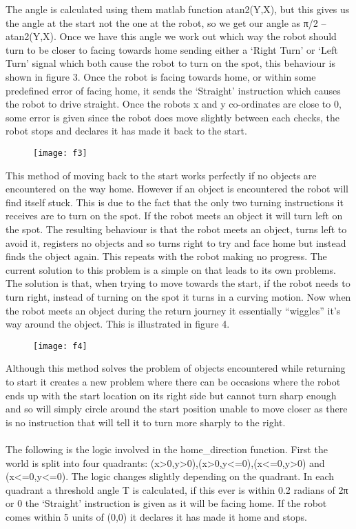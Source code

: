 \documentclass[]{article}
\begin{document}
The angle is calculated using them matlab function atan2(Y,X), but this gives us the angle at the start not the one at the robot, so we get our angle as π/2 – atan2(Y,X). Once we have this angle we work out which way the robot should turn to be closer to facing towards home sending either a ‘Right Turn’ or ‘Left Turn’ signal which both cause the robot to turn on the spot, this behaviour is shown in figure 3. Once the robot is facing towards home, or within some predefined error of facing home, it sends the ‘Straight’ instruction which causes the robot to drive straight. Once the robots x and y co-ordinates are close to 0, some error is given since the robot does move slightly between each checks, the robot stops and declares it has made it back to the start.\\
\begin{figure}
 \centering
 \texttt{[image: f3]}
 \caption{}
\end{figure}
This method of moving back to the start works perfectly if no objects are encountered on the way home. However if an object is encountered the robot will find itself stuck. This is due to the fact that the only two turning instructions it receives are to turn on the spot. If the robot meets an object it will turn left on the spot. The resulting behaviour is that the robot meets an object, turns left to avoid it, registers no objects and so turns right to try and face home but instead finds the object again. This repeats with the robot making no progress. The current solution to this problem is a simple on that leads to its own problems. The solution is that, when trying to move towards the start, if the robot needs to turn right, instead of turning on the spot it turns in a curving motion. Now when the robot meets an object during the return journey it essentially “wiggles” it’s way around the object. This is illustrated in figure 4.\\
\begin{figure}
 \centering
 \texttt{[image: f4]}
 \caption{}
\end{figure}
Although this method solves the problem of objects encountered while returning to start it creates a new problem where there can be occasions where the robot ends up with the start location on its right side but cannot turn sharp enough and so will simply circle around the start position unable to move closer as there is no instruction that will tell it to turn more sharply to the right.
\\\\
The following is the logic involved in the home\_direction function. First the world is split into four quadrants: (x>0,y>0),(x>0,y<=0),(x<=0,y>0) and (x<=0,y<=0). The logic changes slightly depending on the quadrant. In each quadrant a threshold angle T is calculated, if this ever is within 0.2 radians of 2π or 0 the ‘Straight’ instruction is given as it will be facing home. If the robot comes within 5 units of (0,0) it declares it has made it home and stops.
\end{document}
